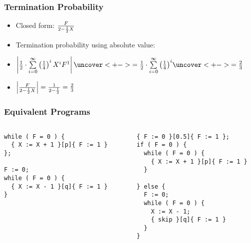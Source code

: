 \begin{frame}
	\frametitle{Termination Probability}
	\begin{itemize}[<+->]
		\itemspacing{10pt}
		
		\item Closed form: $ \frac{F}{2 - \frac{1}{2} X} $
		\item Termination probability using absolute value:
		\item $ \l| \hf \cdot \sum\limits_{i = 0}^{\infty} \l(\frac{1}{4}\r)^i X^i F^1 \r|
			\uncover<+->{
				= \hf \cdot \sum\limits_{i = 0}^{\infty} \l(\frac{1}{4}\r)^i 
			}
			\uncover<+->{
				=  \frac{2}{3}
			} $
		\item $ \left| \frac{F}{2 - \frac{1}{2} X} \right| = \frac{1}{2 - \frac{1}{2}} = \frac{2}{3} $
	\end{itemize}
\end{frame}

\begin{frame}[fragile]
	\frametitle{Equivalent Programs}
	\begin{columns}
		\begin{column}[t]{0.5\textwidth}
			\begin{lstlisting}[basicstyle=\scriptsize]
while ( F = 0 ) {
  { X := X + 1 }[p]{ F := 1 }
};
 
F := 0;
while ( F = 0 ) {
  { X := X - 1 }[q]{ F := 1 }
}
			\end{lstlisting}
		\end{column}
		\hspace{-20pt}
		{ \vrule width 1pt }
		\hspace{7pt}
		\begin{column}[t]{0.5\textwidth}
			\begin{lstlisting}[basicstyle=\scriptsize]
{ F := 0 }[0.5]{ F := 1 };
if ( F = 0 ) {
  while ( F = 0 ) {
    { X := X + 1 }[p]{ F := 1 }
  }

} else {
  F := 0;
  while ( F = 0 ) {
    X := X - 1;
    { skip }[q]{ F := 1 }
  }
}
			\end{lstlisting}
		\end{column}
	\end{columns}
\end{frame}

